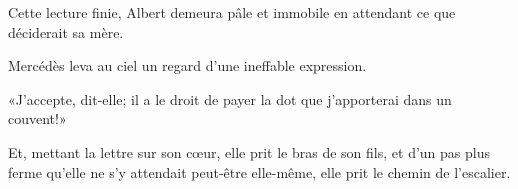 Cette lecture finie, Albert demeura pâle et immobile en attendant ce que déciderait sa mère. 

Mercédès leva au ciel un regard d'une ineffable expression. 

«J'accepte, dit-elle; il a le droit de payer la dot que j'apporterai dans un couvent!» 

Et, mettant la lettre sur son cœur, elle prit le bras de son fils, et d'un pas plus ferme qu'elle ne s'y attendait peut-être elle-même, elle prit le chemin de l'escalier. 